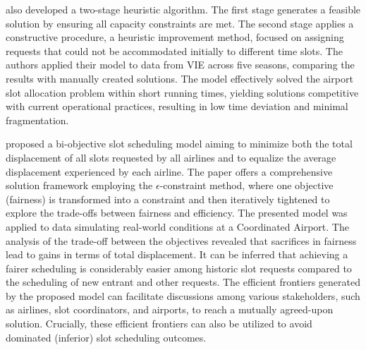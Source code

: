  also developed a two-stage heuristic algorithm. The first stage generates a feasible solution by ensuring all capacity constraints are met. The second stage applies a constructive procedure, a heuristic improvement method, focused on assigning requests that could not be accommodated initially to different time slots. The authors applied their model to data from \acrfull{VIE} across five seasons, comparing the results with manually created solutions. The model effectively solved the airport slot allocation problem within short running times, yielding solutions competitive with current operational practices, resulting in low time deviation and minimal fragmentation.

 proposed a bi-objective slot scheduling model aiming to minimize both the total displacement of all slots requested by all airlines and to equalize the average displacement experienced by each airline. The paper offers a comprehensive solution framework employing the $\epsilon$-constraint method, where one objective (fairness) is transformed into a constraint and then iteratively tightened to explore the trade-offs between fairness and efficiency. The presented model was applied to data simulating real-world conditions at a Coordinated Airport. The analysis of the trade-off between the objectives revealed that sacrifices in fairness lead to gains in terms of total displacement. It can be inferred that achieving a fairer scheduling is considerably easier among historic slot requests compared to the scheduling of new entrant and other requests. The efficient frontiers generated by the proposed model can facilitate discussions among various stakeholders, such as airlines, slot coordinators, and airports, to reach a mutually agreed-upon solution. Crucially, these efficient frontiers can also be utilized to avoid dominated (inferior) slot scheduling outcomes.

